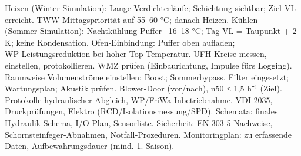 {}
\markdownRendererSectionEnd \markdownRendererSectionBegin
{}\markdownRendererInterblockSeparator
{}\markdownRendererUlBeginTight
\markdownRendererUlItem Heizen (Winter‑Simulation):\markdownRendererUlItemEnd 
\markdownRendererUlItem Lange Verdichterläufe; Schichtung sichtbar; Ziel‑VL erreicht.\markdownRendererUlItemEnd 
\markdownRendererUlItem TWW‑Mittagspriorität auf 55–60 °C; danach Heizen.\markdownRendererUlItemEnd 
\markdownRendererUlItem Kühlen (Sommer‑Simulation):\markdownRendererUlItemEnd 
\markdownRendererUlItem Nachtkühlung Puffer ~16–18 °C; Tag VL = Taupunkt + 2 K; keine Kondensation.\markdownRendererUlItemEnd 
\markdownRendererUlItem Ofen‑Einbindung:\markdownRendererUlItemEnd 
\markdownRendererUlItem Puffer oben aufladen; WP‑Leistungsreduktion bei hoher Top‑Temperatur.\markdownRendererUlItemEnd 
\markdownRendererUlEndTight \markdownRendererInterblockSeparator
{}
\markdownRendererSectionEnd \markdownRendererSectionBegin
{}\markdownRendererInterblockSeparator
{}\markdownRendererUlBeginTight
\markdownRendererUlItem UFH‑Kreise messen, einstellen, protokollieren.\markdownRendererUlItemEnd 
\markdownRendererUlItem WMZ prüfen (Einbaurichtung, Impulse fürs Logging).\markdownRendererUlItemEnd 
\markdownRendererUlEndTight \markdownRendererInterblockSeparator
{}
\markdownRendererSectionEnd \markdownRendererSectionBegin
{}\markdownRendererInterblockSeparator
{}\markdownRendererUlBeginTight
\markdownRendererUlItem Raumweise Volumenströme einstellen; Boost; Sommerbypass.\markdownRendererUlItemEnd 
\markdownRendererUlItem Filter eingesetzt; Wartungsplan; Akustik prüfen.\markdownRendererUlItemEnd 
\markdownRendererUlEndTight \markdownRendererInterblockSeparator
{}
\markdownRendererSectionEnd \markdownRendererSectionBegin
{}\markdownRendererInterblockSeparator
{}\markdownRendererUlBeginTight
\markdownRendererUlItem Blower‑Door (vor/nach), n50 ≤ 1,5 h⁻¹ (Ziel).\markdownRendererUlItemEnd 
\markdownRendererUlItem Protokolle hydraulischer Abgleich, WP/FriWa‑Inbetriebnahme.\markdownRendererUlItemEnd 
\markdownRendererUlItem VDI 2035, Druckprüfungen, Elektro (RCD/Isolationsmessung/SPD).\markdownRendererUlItemEnd 
\markdownRendererUlItem Schemata: finales Hydraulik‑Schema, I/O‑Plan, Sensorliste.\markdownRendererUlItemEnd 
\markdownRendererUlItem Sicherheit: EN 303‑5 Nachweise, Schornsteinfeger‑Abnahmen, Notfall‑Prozeduren.\markdownRendererUlItemEnd 
\markdownRendererUlItem Monitoringplan: zu erfassende Daten, Aufbewahrungsdauer (mind. 1. Saison).\markdownRendererUlItemEnd 
\markdownRendererUlEndTight 
\markdownRendererSectionEnd 
\markdownRendererSectionEnd \markdownRendererDocumentEnd